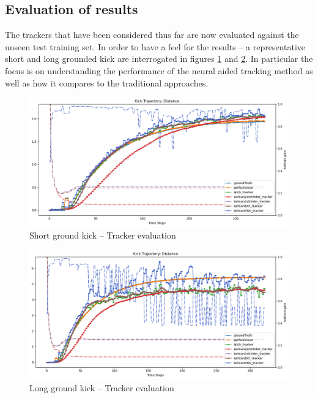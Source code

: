\documentclass[a4paper,twoside,12pt]{report}
\begin{document}
\subsection{Evaluation of results}

The trackers that have been considered thus far are now evaluated against the unseen test training set. In order to have a feel for the results -- a representative short and long grounded kick are interrogated in figures \ref{fig:evalgroundshort} and \ref{fig:evalgroundlong}. In particular the focus is on understanding the performance of the neural aided tracking method as well as how it compares to the traditional approaches.

\begin{figure}[h!]
\begin{center}
\includegraphics[width=12cm]{images/eval_ground_short.png}
\caption{Short ground kick -- Tracker evaluation}
\label{fig:evalgroundshort}
\end{center}
\end{figure}

\begin{figure}[h!]
\begin{center}
\includegraphics[width=12cm]{images/eval_ground_long.png}
\caption{Long ground kick -- Tracker evaluation}
\label{fig:evalgroundlong}
\end{center}
\end{figure}
\end{document}
